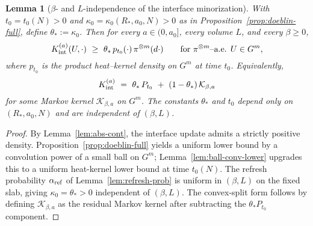\documentclass[11pt]{amsart}
\theoremstyle{plain}
\newtheorem{lemma}[theorem]{Lemma}
\theoremstyle{definition}
\theoremstyle{remark}
\begin{document}
\begin{lemma}[\boldmath$\beta$- and $L$-independence of the interface minorization]\label{lem:beta-L-independent-minorization}
With $t_0=t_0(N)>0$ and $\kappa_0=\kappa_0(R_*,a_0,N)>0$ as in Proposition~\ref{prop:doeblin-full}, define $\theta_*:=\kappa_0$. Then for every $a\in(0,a_0]$, every volume $L$, and every $\beta\ge 0$,
\[
  K_{\rm int}^{(a)}(U,\cdot)\ \ge\ \theta_*\, p_{t_0}(\cdot)\,\pi^{\otimes m}(d\cdot)\qquad\text{for $\pi^{\otimes m}$–a.e. $U\in G^m$,}
\]
where $p_{t_0}$ is the product heat–kernel density on $G^m$ at time $t_0$. Equivalently,
\[
  K_{\rm int}^{(a)}\ =\ \theta_*\,P_{t_0}\ +\ (1-\theta_*)\,\mathcal K_{\beta,a}
\]
for some Markov kernel $\mathcal K_{\beta,a}$ on $G^m$. The constants $\theta_*$ and $t_0$ depend only on $(R_*,a_0,N)$ and are independent of $(\beta,L)$.
\end{lemma}

\begin{proof}
By Lemma~\ref{lem:abs-cont}, the interface update admits a strictly positive density. Proposition~\ref{prop:doeblin-full} yields a uniform lower bound by a convolution power of a small ball on $G^m$; Lemma~\ref{lem:ball-conv-lower} upgrades this to a uniform heat-kernel lower bound at time $t_0(N)$. The refresh probability $\alpha_{\rm ref}$ of Lemma~\ref{lem:refresh-prob} is uniform in $(\beta,L)$ on the fixed slab, giving $\kappa_0=\theta_*>0$ independent of $(\beta,L)$. The convex-split form follows by defining $\mathcal K_{\beta,a}$ as the residual Markov kernel after subtracting the $\theta_* P_{t_0}$ component.
\end{proof}
\end{document}
